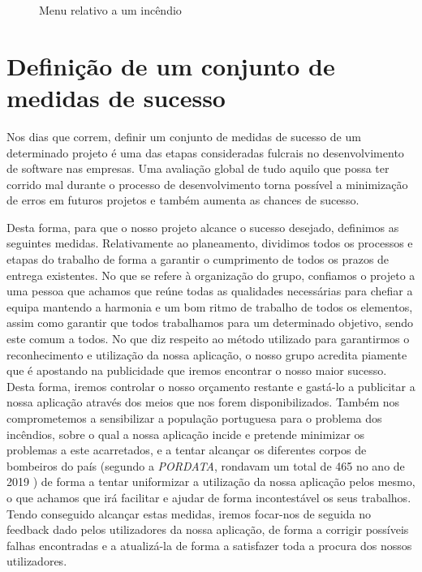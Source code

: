 \documentclass[a4paper,12pt]{scrreprt}
\newcommand{\tab}{
    \hspace{1cm}}
\begin{document}
        \begin{figure}[hbt!]
            \centering
            \caption{Menu relativo a um incêndio}
        \end{figure}

    \section{Definição de um conjunto de medidas de sucesso}
        \tab Nos dias que correm, definir um conjunto de medidas de sucesso de um determinado projeto é uma das etapas consideradas fulcrais no desenvolvimento de software nas empresas. Uma avaliação global de tudo aquilo que possa ter corrido mal durante o processo de desenvolvimento torna possível a minimização de erros em futuros projetos e também aumenta as chances de sucesso.
        
        \tab Desta forma, para que o nosso projeto alcance o sucesso desejado, definimos as seguintes medidas. Relativamente ao planeamento, dividimos todos os processos e etapas do trabalho de forma a garantir o cumprimento de todos os prazos de entrega existentes. No que se refere à organização do grupo, confiamos o projeto a uma pessoa que achamos que reúne todas as qualidades necessárias para chefiar a equipa mantendo a harmonia e um bom ritmo de trabalho de todos os elementos, assim como garantir que todos trabalhamos para um determinado objetivo, sendo este comum a todos. No que diz respeito ao método utilizado para garantirmos o reconhecimento e utilização da nossa aplicação, o nosso grupo acredita piamente que é apostando na publicidade que iremos encontrar o nosso maior sucesso. Desta forma, iremos controlar o nosso orçamento restante e gastá-lo a publicitar a nossa aplicação através dos meios que nos forem disponibilizados. Também nos comprometemos a sensibilizar a população portuguesa para o problema dos incêndios, sobre o qual a nossa aplicação incide e pretende minimizar os problemas a este acarretados, e a tentar alcançar os diferentes corpos de bombeiros do país (segundo a \textit{PORDATA}, rondavam um total de 465 no ano de 2019 \cite{corpos_bombeiros}) de forma a tentar uniformizar a utilização da nossa aplicação pelos mesmo, o que achamos que irá facilitar e ajudar de forma incontestável os seus trabalhos. Tendo conseguido alcançar estas medidas, iremos focar-nos de seguida no feedback dado pelos utilizadores da nossa aplicação, de forma a corrigir possíveis falhas encontradas e a atualizá-la de forma a satisfazer toda a procura dos nossos utilizadores.
        
\end{document}
